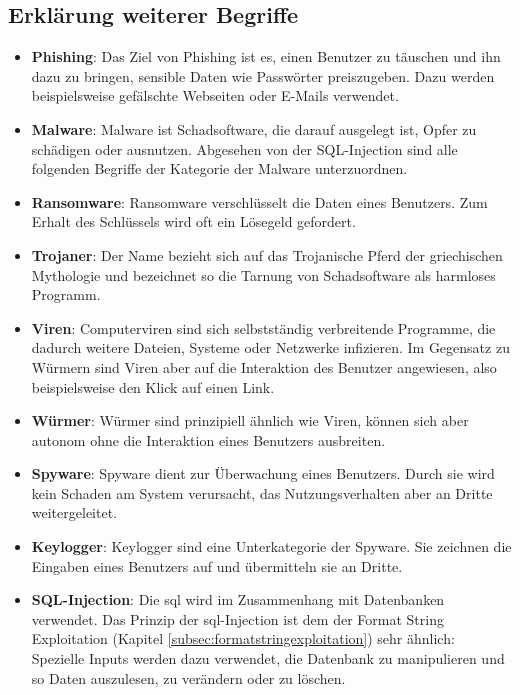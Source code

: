 \documentclass[11pt, a4paper]{article}
\begin{document}
\subsection{Erklärung weiterer Begriffe}
\begin{itemize}
	\item \textbf{Phishing}: Das Ziel von Phishing ist es, einen Benutzer zu täuschen und ihn dazu zu bringen, sensible Daten wie Passwörter preiszugeben. Dazu werden beispielsweise gefälschte Webseiten oder E-Mails verwendet.~\cite{Phishing:online}
	\item \textbf{Malware}: Malware ist Schadsoftware, die darauf ausgelegt ist, Opfer zu schädigen oder ausnutzen. Abgesehen von der SQL-Injection sind alle folgenden Begriffe der Kategorie der Malware unterzuordnen.~\cite{Schadpro:online}
	\item \textbf{Ransomware}: Ransomware verschlüsselt die Daten eines Benutzers. Zum Erhalt des Schlüssels wird oft ein Lösegeld gefordert.~\cite{Schadpro:online}
	\item \textbf{Trojaner}: Der Name bezieht sich auf das Trojanische Pferd der griechischen Mythologie und bezeichnet so die Tarnung von Schadsoftware als harmloses Programm.~\cite{Schadpro:online}
	\item \textbf{Viren}: Computerviren sind sich selbstständig verbreitende Programme, die dadurch weitere Dateien, Systeme oder Netzwerke infizieren. Im Gegensatz zu Würmern sind Viren aber auf die Interaktion des Benutzer angewiesen, also beispielsweise den Klick auf einen Link. ~\cite{Malwarev:online}
	\item \textbf{Würmer}: Würmer sind prinzipiell ähnlich wie Viren, können sich aber autonom ohne die Interaktion eines Benutzers ausbreiten.~\cite{Malwarev:online}
	\item \textbf{Spyware}: Spyware dient zur Überwachung eines Benutzers. Durch sie wird kein Schaden am System verursacht, das Nutzungsverhalten aber an Dritte weitergeleitet.~\cite{Schadpro:online}
	\item \textbf{Keylogger}: Keylogger sind eine Unterkategorie der Spyware. Sie zeichnen die Eingaben eines Benutzers auf und übermitteln sie an Dritte.~\cite{Schadpro:online}
	\item \textbf{SQL-Injection}: Die \gls{sql} wird im Zusammenhang mit Datenbanken verwendet. Das Prinzip der \gls{sql}-Injection ist dem der Format String Exploitation (Kapitel \ref{subsec:formatstringexploitation}) sehr ähnlich: Spezielle Inputs werden dazu verwendet, die Datenbank zu manipulieren und so Daten auszulesen, zu verändern oder zu löschen.~\cite{SQLInjec:online}
\end{itemize}
\end{document}
